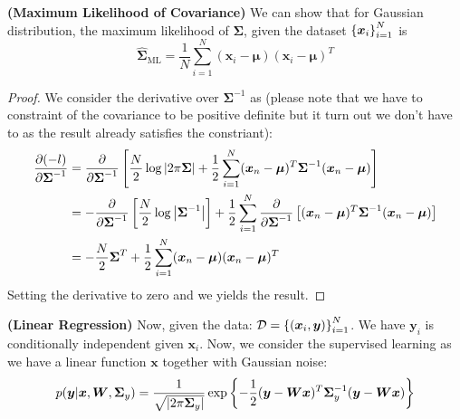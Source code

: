 \begin{proposition}{\textbf{(Maximum Likelihood of Covariance)}}
    We can show that for Gaussian distribution, the maximum likelihood of $\boldsymbol \Sigma$, given the dataset $\left\{ \boldsymbol x_i \right\}^N_{i=1}$ is 
   \begin{equation*}
       \hat{\boldsymbol \Sigma}_\text{ML} = \frac{1}{N}\sum^N_{i=1}(\boldsymbol x_i - \boldsymbol \mu)(\boldsymbol x_i - \boldsymbol \mu)^T
   \end{equation*} 
\end{proposition}
\begin{proof}
    We consider the derivative over $\boldsymbol \Sigma^{-1}$ as (please note that we have to constraint of the covariance to be positive definite but it turn out we don't have to as the result already satisfies the constriant):
    \begin{equation*}
    \begin{aligned}
        \frac{\partial (-l)}{\partial \boldsymbol \Sigma^{-1}} 
        &= \frac{\partial}{\partial \boldsymbol \Sigma^{-1}}\left[ \frac{N}{2}\log\left| 2\pi\boldsymbol \Sigma \right| + \frac{1}{2}\sum^N_{i=1}(\boldsymbol x_n - \boldsymbol \mu)^T\boldsymbol \Sigma^{-1}(\boldsymbol x_n - \boldsymbol \mu) \right] \\
        &= -\frac{\partial}{\partial \boldsymbol \Sigma^{-1}}\left[ \frac{N}{2}\log\left| \boldsymbol \Sigma^{-1} \right| \right] + \frac{1}{2}\sum^N_{i=1}\frac{\partial}{\partial \boldsymbol \Sigma^{-1}}\left[ (\boldsymbol x_n - \boldsymbol \mu)^T\boldsymbol \Sigma^{-1}(\boldsymbol x_n - \boldsymbol \mu) \right] \\
        &= -\frac{N}{2}\boldsymbol \Sigma^T + \frac{1}{2}\sum^N_{i=1}(\boldsymbol x_n - \boldsymbol \mu)(\boldsymbol x_n - \boldsymbol \mu)^T \\
    \end{aligned}
    \end{equation*}
    Setting the derivative to zero and we yields the result.
\end{proof}

\begin{definition}{ \textbf{(Linear Regression)}}
    Now, given the data: $\mathcal{D}=\left\{ (\boldsymbol x_i, \boldsymbol y) \right\}^N_{i=1}$. We have $\boldsymbol y_i$ is conditionally independent given $\boldsymbol x_i$. Now, we consider the supervised learning as we have a linear function $\boldsymbol x$ together with Gaussian noise:
    \begin{equation*}
        p(\boldsymbol y | \boldsymbol x, \boldsymbol W, \boldsymbol \Sigma_y) = \frac{1}{\sqrt{\left| 2\pi\boldsymbol \Sigma_y \right|}} \exp\left\{ -\frac{1}{2}(\boldsymbol y - \boldsymbol W\boldsymbol x)^T\boldsymbol \Sigma_y^{-1}(\boldsymbol y - \boldsymbol W\boldsymbol x) \right\}
    \end{equation*}
\end{definition}

